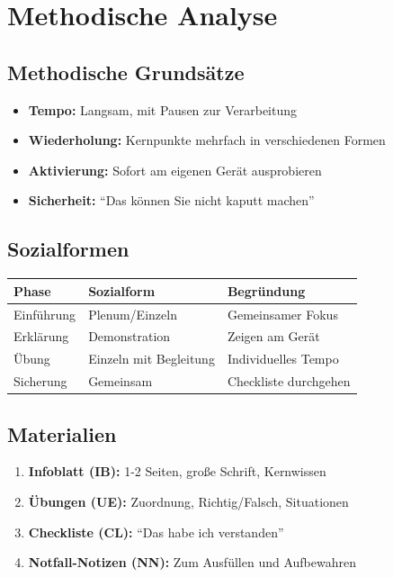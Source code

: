 \documentclass[11pt,a4paper]{article}
\begin{document}
\section{Methodische Analyse}

\subsection{Methodische Grundsätze}

\begin{itemize}
    \item \textbf{Tempo:} Langsam, mit Pausen zur Verarbeitung
    \item \textbf{Wiederholung:} Kernpunkte mehrfach in verschiedenen Formen
    \item \textbf{Aktivierung:} Sofort am eigenen Gerät ausprobieren
    \item \textbf{Sicherheit:} ``Das können Sie nicht kaputt machen''
\end{itemize}

\subsection{Sozialformen}

\begin{tabular}{|l|l|l|}
\hline
\textbf{Phase} & \textbf{Sozialform} & \textbf{Begründung} \\
\hline
Einführung & Plenum/Einzeln & Gemeinsamer Fokus \\
Erklärung & Demonstration & Zeigen am Gerät \\
Übung & Einzeln mit Begleitung & Individuelles Tempo \\
Sicherung & Gemeinsam & Checkliste durchgehen \\
\hline
\end{tabular}

\subsection{Materialien}

\begin{enumerate}
    \item \textbf{Infoblatt (IB):} 1-2 Seiten, große Schrift, Kernwissen
    \item \textbf{Übungen (UE):} Zuordnung, Richtig/Falsch, Situationen
    \item \textbf{Checkliste (CL):} ``Das habe ich verstanden''
    \item \textbf{Notfall-Notizen (NN):} Zum Ausfüllen und Aufbewahren
\end{enumerate}
\end{document}
